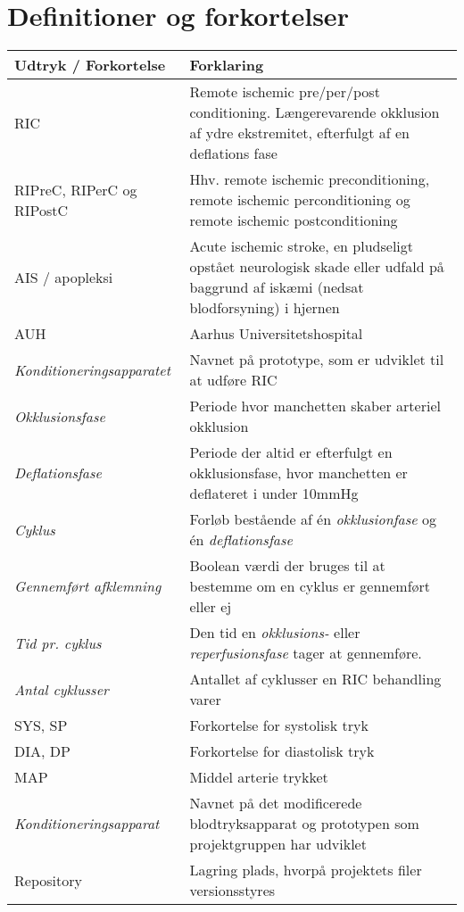 \chapter*{Definitioner og forkortelser}
	\begin{longtable}{ |p{} |p{}| } 
		\hline
		\textbf{Udtryk / Forkortelse} &  \textbf{Forklaring} \\
		\hline
		RIC & Remote ischemic pre/per/post conditioning. Længerevarende okklusion af ydre ekstremitet, efterfulgt af en deflations fase\\
		\hline
		RIPreC, RIPerC og RIPostC & Hhv. remote ischemic preconditioning, remote ischemic perconditioning og remote ischemic postconditioning\\
		\hline
		AIS / apopleksi & Acute ischemic stroke, en pludseligt opstået neurologisk skade eller udfald på baggrund af iskæmi (nedsat blodforsyning) i hjernen \\
		\hline
		AUH & Aarhus Universitetshospital \\
		\hline
		\textit{Konditioneringsapparatet} & Navnet på prototype, som er udviklet til at udføre RIC \\
		\hline
		\textit{Okklusionsfase} & Periode hvor manchetten skaber arteriel okklusion \\
		\hline
		\textit{Deflationsfase} & Periode der altid er efterfulgt en okklusionsfase, hvor manchetten er deflateret i under 10mmHg\\
		\hline
		\textit{Cyklus} & Forløb bestående af én \textit{okklusionfase} og én \textit{deflationsfase} \\
		\hline
		\textit{Gennemført afklemning} & Boolean værdi der bruges til at bestemme om en cyklus er gennemført eller ej \\
		\hline
		\textit{Tid pr. cyklus} & Den tid en \textit{okklusions-} eller \textit{reperfusionsfase} tager at gennemføre. \\
		\hline
		\textit{Antal cyklusser} & Antallet af cyklusser en RIC behandling varer \\
		\hline
		SYS, SP & Forkortelse for systolisk tryk \\
		\hline
		DIA, DP & Forkortelse for diastolisk tryk \\
		\hline
		MAP & Middel arterie trykket \\
		\hline
		\textit{Konditioneringsapparat} & Navnet på det modificerede blodtryksapparat og prototypen som projektgruppen har udviklet \\
		\hline
		Repository & Lagring plads, hvorpå projektets filer versionsstyres \\

\end{longtable}
